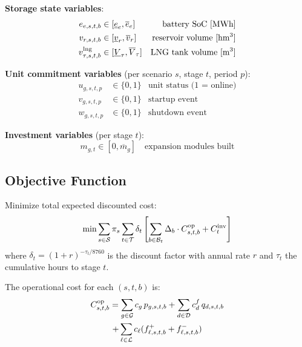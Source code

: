 \noindent\textbf{Storage state variables}:
\begin{align}
  e_{e,s,t,b}  &\in [\underline{e}_e, \overline{e}_e]
    & \text{battery SoC [MWh]} \label{eq:soc} \\
  v_{r,s,t,b}  &\in [\underline{v}_r, \overline{v}_r]
    & \text{reservoir volume [hm\textsuperscript{3}]} \label{eq:vol} \\
  v_{\tau,s,t,b}^{\text{lng}}
               &\in [\underline{V}_\tau, \overline{V}_\tau]
    & \text{LNG tank volume [m\textsuperscript{3}]} \label{eq:lng_vol}
\end{align}

\noindent\textbf{Unit commitment variables} (per scenario $s$, stage $t$, period $p$):
\begin{align}
  u_{g,s,t,p} &\in \{0,1\} & \text{unit status (1 = online)} \\
  v_{g,s,t,p} &\in \{0,1\} & \text{startup event} \\
  w_{g,s,t,p} &\in \{0,1\} & \text{shutdown event}
\end{align}

\noindent\textbf{Investment variables} (per stage $t$):
\begin{equation}
  m_{g,t} \in [0, \overline{m}_g]
  \quad \text{expansion modules built} \label{eq:expmod}
\end{equation}

\subsection{Objective Function}

Minimize total expected discounted cost:
\begin{equation}
\label{eq:objective}
\min \sum_{s \in \mathcal{S}} \pi_s \sum_{t \in \mathcal{T}} \delta_t
\left[
  \sum_{b \in \mathcal{B}_t} \Delta_b \cdot C^\text{op}_{s,t,b}
  + C^\text{inv}_t
\right]
\end{equation}
where $\delta_t = (1+r)^{-\tau_t/8760}$ is the discount factor with annual
rate $r$ and $\tau_t$ the cumulative hours to stage $t$.

The operational cost for each $(s,t,b)$ is:
\begin{multline}
\label{eq:opcost}
C^\text{op}_{s,t,b} = \sum_{g \in \mathcal{G}} c_g \, p_{g,s,t,b}
  + \sum_{d \in \mathcal{D}} c^f_d \, q_{d,s,t,b} \\
  + \sum_{\ell \in \mathcal{L}} c_\ell
    (f^+_{\ell,s,t,b} + f^-_{\ell,s,t,b})
\end{multline}

